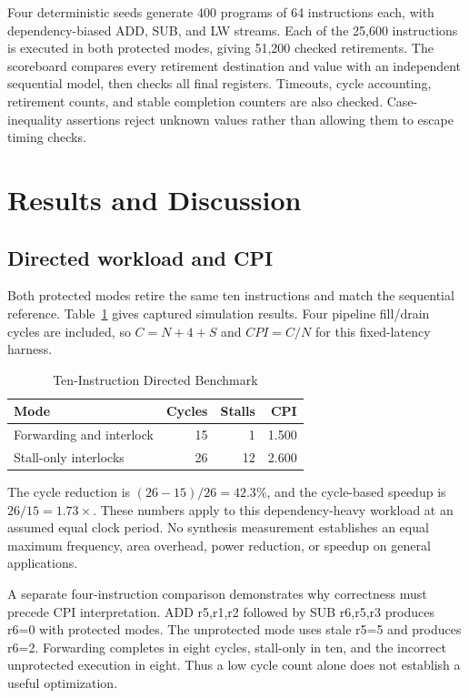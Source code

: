 \documentclass[conference]{IEEEtran}
\begin{document}
Four deterministic seeds generate 400 programs of 64 instructions each, with dependency-biased ADD, SUB, and LW streams. Each of the 25,600 instructions is executed in both protected modes, giving 51,200 checked retirements. The scoreboard compares every retirement destination and value with an independent sequential model, then checks all final registers. Timeouts, cycle accounting, retirement counts, and stable completion counters are also checked. Case-inequality assertions reject unknown values rather than allowing them to escape timing checks.

\section{Results and Discussion}
\subsection{Directed workload and CPI}
Both protected modes retire the same ten instructions and match the sequential reference. Table~\ref{tab:cpi} gives captured simulation results. Four pipeline fill/drain cycles are included, so $C=N+4+S$ and $CPI=C/N$ for this fixed-latency harness.

\begin{table}[t]
\caption{Ten-Instruction Directed Benchmark}
\label{tab:cpi}\centering
\begin{tabular}{lrrr}
\toprule Mode & Cycles & Stalls & CPI\\\midrule
Forwarding and interlock & 15 & 1 & 1.500\\
Stall-only interlocks & 26 & 12 & 2.600\\\bottomrule
\end{tabular}
\end{table}

The cycle reduction is $(26-15)/26=42.3\%$, and the cycle-based speedup is $26/15=1.73\times$. These numbers apply to this dependency-heavy workload at an assumed equal clock period. No synthesis measurement establishes an equal maximum frequency, area overhead, power reduction, or speedup on general applications.

A separate four-instruction comparison demonstrates why correctness must precede CPI interpretation. ADD r5,r1,r2 followed by SUB r6,r5,r3 produces r6=0 with protected modes. The unprotected mode uses stale r5=5 and produces r6=2. Forwarding completes in eight cycles, stall-only in ten, and the incorrect unprotected execution in eight. Thus a low cycle count alone does not establish a useful optimization.
\end{document}
